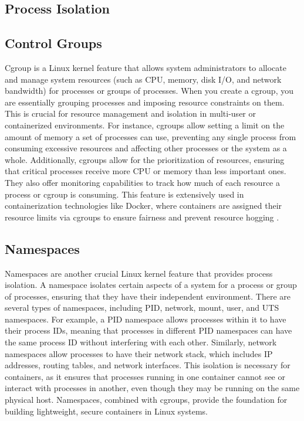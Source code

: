 \begin{doublespace}
\section{Process Isolation}

\subsection{Control Groups}
Cgroup is a Linux kernel feature that allows system administrators to allocate and manage system resources (such as CPU, memory, disk I/O, and network bandwidth) for processes or groups of processes. When you create a cgroup, you are essentially grouping processes and imposing resource constraints on them. This is crucial for resource management and isolation in multi-user or containerized environments. For instance, cgroups allow setting a limit on the amount of memory a set of processes can use, preventing any single process from consuming excessive resources and affecting other processes or the system as a whole. Additionally, cgroups allow for the prioritization of resources, ensuring that critical processes receive more CPU or memory than less important ones. They also offer monitoring capabilities to track how much of each resource a process or cgroup is consuming. This feature is extensively used in containerization technologies like Docker, where containers are assigned their resource limits via cgroups to ensure fairness and prevent resource hogging \cite{brown2014cgroups}.

\subsection{Namespaces}
Namespaces are another crucial Linux kernel feature that provides process isolation. A namespace isolates certain aspects of a system for a process or group of processes, ensuring that they have their independent environment. There are several types of namespaces, including PID, network, mount, user, and UTS namespaces. For example, a PID namespace allows processes within it to have their process IDs, meaning that processes in different PID namespaces can have the same process ID without interfering with each other. Similarly, network namespaces allow processes to have their network stack, which includes IP addresses, routing tables, and network interfaces. This isolation is necessary for containers, as it ensures that processes running in one container cannot see or interact with processes in another, even though they may be running on the same physical host. Namespaces, combined with cgroups, provide the foundation for building lightweight, secure containers in Linux systems.


\end{doublespace}

